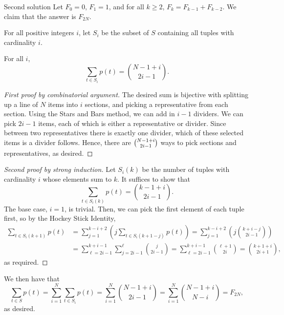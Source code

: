 \begin{customenv}{Second solution}
    Let $F_0=0$, $F_1=1$, and for all $k\ge 2$, $F_k=F_{k-1}+F_{k-2}$. We claim that the answer is $F_{2N}$.

    For all positive integers $i$, let $S_i$ be the subset of $S$ containing all tuples with cardinality $i$.
    \begin{iclaim*}
        For all $i$, \[\sum_{t\in S_i}p(t)=\binom{N-1+i}{2i-1}.\]
    \end{iclaim*}
    \begin{proof}[First proof by combinatorial argument]
        The desired sum is bijective with splitting up a line of $N$ items into $i$ sections, and picking a representative from each section. Using the Stars and Bars method, we can add in $i-1$ dividers. We can pick $2i-1$ items, each of which is either a representative or divider. Since between two representatives there is exactly one divider, which of these selected items is a divider follows. Hence, there are $\tbinom{N-1+i}{2i-1}$ ways to pick sections and representatives, as desired.
    \end{proof}
    \begin{proof}[Second proof by strong induction]
        Let $S_i(k)$ be the number of tuples with cardinality $i$ whose elements sum to $k$. It suffices to show that \[\sum_{t\in S_i(k)}p(t)=\binom{k-1+i}{2i-1}.\]
        The base case, $i=1$, is trivial. Then, we can pick the first element of each tuple first, so by the Hockey Stick Identity,
        \begin{align*}
            \sum_{t\in S_i(k+1)}p(t)&=\sum_{j=1}^{k-i+2}\left(j\sum_{t\in S_i(k+1-j)}p(t)\right)=\sum_{j=1}^{k-i+2}\left(j\binom{k+i-j}{2i-1}\right)\\
            &=\sum_{\ell=2i-1}^{k+i-1}\sum_{j=2i-1}^\ell\binom{j}{2i-1}=\sum_{\ell=2i-1}^{k+i-1}\binom{\ell+1}{2i}=\binom{k+1+i}{2i+1},
        \end{align*}
        as required.
    \end{proof}

    We then have that
    \[\sum_{t\in S}p(t)=\sum_{i=1}^{N}\sum_{t\in S_i}p(t)=\sum_{i=1}^{N}\binom{N-1+i}{2i-1}=\sum_{i=1}^{N}\binom{N-1+i}{N-i}=F_{2N},\]
    as desired.
\end{customenv}

